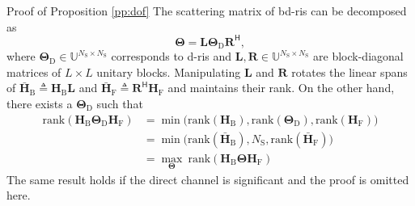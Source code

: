 \documentclass[journal]{IEEEtran}
\begin{document}
\begin{appendix}
	\begin{subsection}{Proof of Proposition \ref{pp:dof}}\label{ap:dof}
		The scattering matrix of \gls{bd}-\gls{ris} can be decomposed as
		\begin{equation}
			\mathbf{\Theta} = \mathbf{L} \mathbf{\Theta}_\mathrm{D} \mathbf{R}^\mathsf{H},
		\end{equation}
		where $\mathbf{\Theta}_\mathrm{D} \in \mathbb{U}^{N_\mathrm{S} \times N_\mathrm{S}}$ corresponds to \gls{d}-\gls{ris} and $\mathbf{L}, \mathbf{R} \in \mathbb{U}^{N_\mathrm{S} \times N_\mathrm{S}}$ are block-diagonal matrices of $L \times L$ unitary blocks.
		Manipulating $\mathbf{L}$ and $\mathbf{R}$ rotates the linear spans of $\bar{\mathbf{H}}_\mathrm{B} \triangleq \mathbf{H}_\mathrm{B} \mathbf{L}$ and $\bar{\mathbf{H}}_\mathrm{F} \triangleq \mathbf{R}^\mathsf{H} \mathbf{H}_\mathrm{F}$ and maintains their rank.
		On the other hand, there exists a $\mathbf{\Theta}_\mathrm{D}$ such that
		\begin{equation*}
			\begin{split}
				\mathrm{rank}(\mathbf{H}_\mathrm{B} \mathbf{\Theta}_\mathrm{D} \mathbf{H}_\mathrm{F})
				 & = \min \bigl( \mathrm{rank}(\mathbf{H}_\mathrm{B}), \mathrm{rank}(\mathbf{\Theta}_\mathrm{D}), \mathrm{rank}(\mathbf{H}_\mathrm{F}) \bigr) \\
				 & = \min \bigl( \mathrm{rank}(\bar{\mathbf{H}}_\mathrm{B}), N_\mathrm{S}, \mathrm{rank}(\bar{\mathbf{H}}_\mathrm{F}) \bigr)                  \\
				 & = \max_\mathbf{\Theta} \ \mathrm{rank}(\mathbf{H}_\mathrm{B} \mathbf{\Theta} \mathbf{H}_\mathrm{F})
			\end{split}
		\end{equation*}
		The same result holds if the direct channel is significant and the proof is omitted here.
	\end{subsection}


\end{appendix}
\end{document}
